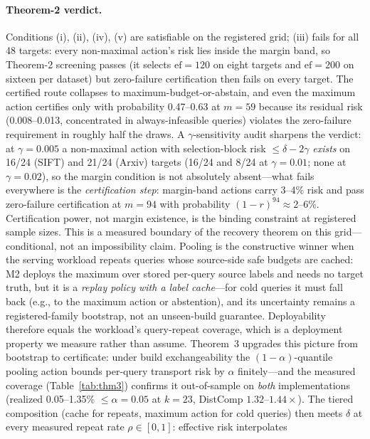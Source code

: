 \documentclass{article}
\begin{document}
\paragraph{Theorem-2 verdict.}
Conditions (i), (ii), (iv), (v) are satisfiable on the registered grid; (iii) fails for all 48 targets:
every non-maximal action's risk lies inside the margin band, so Theorem-2 screening passes (it selects
$\mathrm{ef}{=}120$ on eight targets and $\mathrm{ef}{=}200$ on sixteen per dataset) but zero-failure
certification then fails on every target. The certified route collapses to
maximum-budget-or-abstain, and even the maximum action certifies only with probability 0.47--0.63 at
$m=59$ because its residual risk (0.008--0.013, concentrated in always-infeasible queries) violates the
zero-failure requirement in roughly half the draws. A $\gamma$-sensitivity audit sharpens the verdict: at
$\gamma{=}0.005$ a non-maximal action with selection-block risk $\le\delta-2\gamma$ \emph{exists} on
16/24 (SIFT) and 21/24 (Arxiv) targets (16/24 and 8/24 at $\gamma{=}0.01$; none at $\gamma{=}0.02$), so
the margin condition is not absolutely absent---what fails everywhere is the \emph{certification step}:
margin-band actions carry 3--4\% risk and pass zero-failure certification at $m{=}94$ with probability
$(1-r)^{94}\approx2$--$6\%$. Certification power, not margin existence, is the binding constraint at
registered sample sizes. This is a measured boundary of the recovery theorem on this grid---conditional,
not an impossibility claim. Pooling is the constructive winner when the serving workload repeats queries whose source-side safe
budgets are cached: M2 deploys the maximum over stored per-query source labels and needs no target truth,
but it is a \emph{replay policy with a label cache}---for cold queries it must fall back (e.g., to the
maximum action or abstention), and its uncertainty remains a registered-family bootstrap, not an
unseen-build guarantee. Deployability therefore equals the workload's query-repeat coverage, which is a
deployment property we measure rather than assume. Theorem~3 upgrades this picture from bootstrap to
certificate: under build exchangeability the $(1{-}\alpha)$-quantile pooling action bounds per-query
transport risk by $\alpha$ finitely---and the measured coverage (Table~\ref{tab:thm3}) confirms it
out-of-sample on \emph{both} implementations (realized 0.05--1.35\% $\le\alpha{=}0.05$ at $k{=}23$,
DistComp $1.32$--$1.44\times$). The tiered composition (cache for repeats, maximum action for cold
queries) then meets $\delta$ at every measured repeat rate $\rho\in[0,1]$: effective risk interpolates
\end{document}
